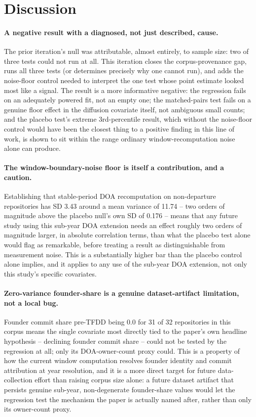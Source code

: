 \documentclass[11pt,letterpaper]{article}
\begin{document}
\section{Discussion}

\paragraph{A negative result with a diagnosed, not just described, cause.} The prior iteration's null was attributable, almost entirely, to sample size: two of three tests could not run at all. This iteration closes the corpus-provenance gap, runs all three tests (or determines precisely why one cannot run), and adds the noise-floor control needed to interpret the one test whose point estimate looked most like a signal. The result is a more informative negative: the regression fails on an adequately powered fit, not an empty one; the matched-pairs test fails on a genuine floor effect in the diffusion covariate itself, not ambiguous small counts; and the placebo test's extreme 3rd-percentile result, which without the noise-floor control would have been the closest thing to a positive finding in this line of work, is shown to sit within the range ordinary window-recomputation noise alone can produce.

\paragraph{The window-boundary-noise floor is itself a contribution, and a caution.} Establishing that stable-period DOA recomputation on non-departure repositories has SD 3.43 around a mean variance of 11.74 -- two orders of magnitude above the placebo null's own SD of 0.176 -- means that any future study using this sub-year DOA extension needs an effect roughly two orders of magnitude larger, in absolute correlation terms, than what the placebo test alone would flag as remarkable, before treating a result as distinguishable from measurement noise. This is a substantially higher bar than the placebo control alone implies, and it applies to any use of the sub-year DOA extension, not only this study's specific covariates.

\paragraph{Zero-variance founder-share is a genuine dataset-artifact limitation, not a local bug.} Founder commit share pre-TFDD being 0.0 for 31 of 32 repositories in this corpus means the single covariate most directly tied to the paper's own headline hypothesis -- declining founder commit share -- could not be tested by the regression at all; only its DOA-owner-count proxy could. This is a property of how the current window computation resolves founder identity and commit attribution at year resolution, and it is a more direct target for future data-collection effort than raising corpus size alone: a future dataset artifact that persists genuine sub-year, non-degenerate founder-share values would let the regression test the mechanism the paper is actually named after, rather than only its owner-count proxy.
\end{document}

